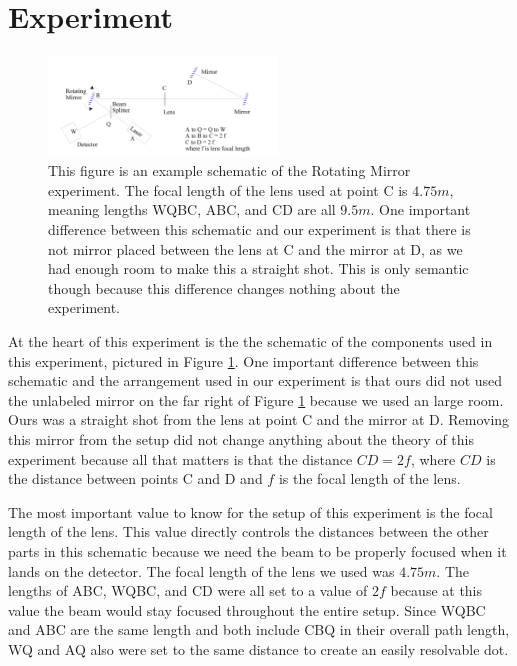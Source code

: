 \documentclass[aps,prl,10pt,twocolumn,floatfix]{revtex4-2}
\begin{document}
\section{Experiment}

\begin{figure}
\includegraphics[width=230px]{Canvas/Diagram.jpg}
\caption{This figure is an example schematic of the Rotating Mirror experiment. The focal length of the lens used at point C is $4.75m$, meaning lengths WQBC, ABC, and CD are all $9.5m$. One important difference between this schematic and our experiment is that there is not mirror placed between the lens at C and the mirror at D, as we had enough room to make this a straight shot. This is only semantic though because this difference changes nothing about the experiment.}
\label{schematic}
\end{figure}

At the heart of this experiment is the the schematic of the components used in this experiment, pictured in Figure \ref{schematic}.
One important difference between this schematic and the arrangement used in our experiment is that ours did not used the unlabeled mirror on the far right of Figure \ref{schematic} because we used an large room.
Ours was a straight shot from the lens at point C and the mirror at D.
Removing this mirror from the setup did not change anything about the theory of this experiment because all that matters is that the distance $CD=2f$, where $CD$ is the distance between points C and D and $f$ is the focal length of the lens. 

The most important value to know for the setup of this experiment is the focal length of the lens. 
This value directly controls the distances between the other parts in this schematic because we need the beam to be properly focused when it lands on the detector. 
The focal length of the lens we used was $4.75m$. 
The lengths of ABC, WQBC, and CD were all set to a value of $2f$ because at this value the beam would stay focused throughout the entire setup. 
Since WQBC and ABC are the same length and both include CBQ in their overall path length, WQ and AQ also were set to the same distance to create an easily resolvable dot. 
\end{document}
